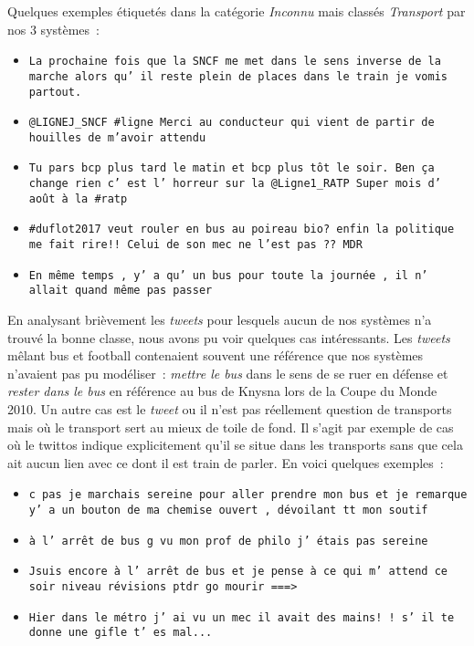 Quelques exemples étiquetés dans la catégorie \emph{Inconnu} mais classés \emph{Transport} par nos 3 systèmes~:
\begin{itemize}
\item \texttt{La prochaine fois que la SNCF me met dans le sens inverse de la marche alors qu' il reste plein de places dans le train je vomis partout.}
\item \texttt{@LIGNEJ\_SNCF \#ligne Merci au conducteur qui vient de partir de houilles de m'avoir attendu}
\item \texttt{Tu pars bcp plus tard le matin et bcp plus tôt le soir. Ben ça change rien c' est l' horreur sur la @Ligne1\_RATP Super mois d' août à la \#ratp}
\item \texttt{\#duflot2017 veut rouler en bus au poireau bio? enfin la politique me fait rire!! Celui de son mec ne l'est pas ?? MDR}
\item \texttt{En même temps , y' a qu' un bus pour toute la journée , il n' allait quand même pas passer}
\end{itemize}

En analysant brièvement les \textit{tweets} pour lesquels aucun de nos systèmes n'a trouvé la bonne classe, nous avons pu voir quelques cas intéressants.
Les \textit{tweets} mêlant bus et football contenaient souvent une référence que nos systèmes n'avaient pas pu modéliser~: \emph{mettre le bus} dans le sens de se ruer en défense et \emph{rester dans le bus} en référence au bus de Knysna lors de la Coupe du Monde 2010.
Un autre cas est le \textit{tweet} ou il n'est pas réellement question de transports mais où le transport sert au mieux de toile de fond.
Il s'agit par exemple de cas où le twittos indique explicitement qu'il se situe dans les transports sans que cela ait aucun lien avec ce dont il est train de parler. En voici quelques exemples~:

\begin{itemize}
\item \texttt{c pas je marchais sereine pour aller prendre mon bus et je remarque y' a un bouton de ma chemise ouvert , dévoilant tt mon soutif}
\item \texttt{à l' arrêt de bus g vu mon prof de philo j' étais pas sereine}
\item \texttt{Jsuis encore à l' arrêt de bus et je pense à ce qui m' attend ce soir niveau révisions ptdr go mourir ===>}
\item \texttt{Hier dans le métro j' ai vu un mec il avait des mains! ! s' il te donne une gifle t' es mal...}
\end{itemize}


